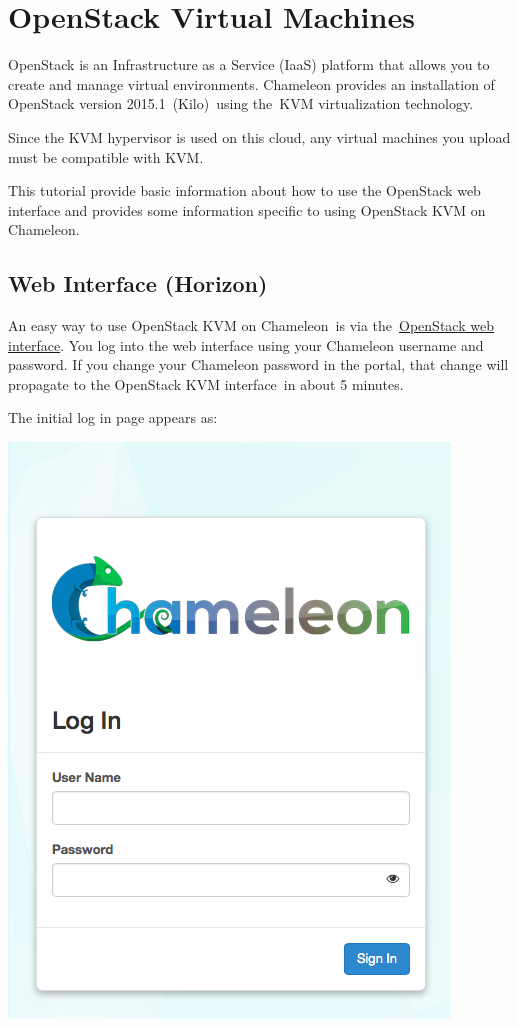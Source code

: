 \FILENAME

\chapter{OpenStack Virtual Machines}\label{alamo-user-guide}

OpenStack is an Infrastructure as a Service (IaaS) platform that allows
you to create and manage virtual environments. Chameleon provides an
installation of OpenStack version 2015.1~(Kilo)~using the~KVM
virtualization technology.

Since the KVM hypervisor is used on this cloud, any virtual machines you
upload must be compatible with KVM.

This tutorial provide basic information about how to use the OpenStack
web interface and provides some information specific to using OpenStack
KVM on Chameleon.

\section{Web Interface (Horizon)}\label{web-interface-horizon}

An easy way to use OpenStack KVM on Chameleon~is via
the~\href{https://openstack.tacc.chameleoncloud.org/dashboard}{OpenStack
web interface}. You log into the web interface using your Chameleon
username and password. If you change your Chameleon password in the
portal, that change will propagate to the OpenStack KVM interface~in
about 5 minutes.

The initial log in page appears as:


\includegraphics[width=0.5\columnwidth]{images/chameleon/chameleon-login.png}

